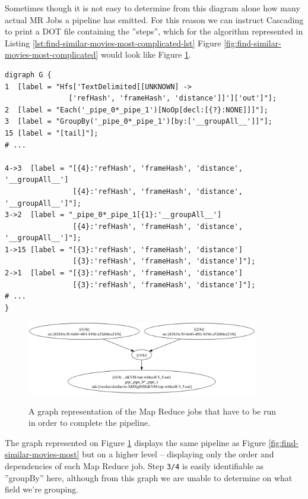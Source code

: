 Sometimes though it is not easy to determine from this diagram alone how many actual MR Jobs a pipeline has emitted. For this reason we can instruct Cascading to print a DOT file containing the ''steps'', which for the algorithm represented in Listing \ref{lst:find-similar-movies-most-complicated-lst} Figure \ref{fig:find-similar-movies-most-complicated} would look like Figure \ref{fig:find-similar-movies-most-complicated-steps}.

\begin{lstlisting}[caption={Fragments of FindMostSimilarMoviesJob.dot}, label={lst:find-similar-movies-most-complicated-lst}]
digraph G {
1  [label = "Hfs['TextDelimited[[UNKNOWN] -> 
               ['refHash', 'frameHash', 'distance']]']['out']"];
2  [label = "Each('_pipe_0*_pipe_1')[NoOp[decl:[{?}:NONE]]]"];
3  [label = "GroupBy('_pipe_0*_pipe_1')[by:['__groupAll__']]"];
15 [label = "[tail]"];
# ...
    
4->3  [label = "[{4}:'refHash', 'frameHash', 'distance', '__groupAll__']
                [{4}:'refHash', 'frameHash', 'distance', '__groupAll__']"];
3->2  [label = "_pipe_0*_pipe_1[{1}:'__groupAll__']
                [{4}:'refHash', 'frameHash', 'distance', '__groupAll__']"];
1->15 [label = "[{3}:'refHash', 'frameHash', 'distance']
                [{3}:'refHash', 'frameHash', 'distance']"];
2->1  [label = "[{3}:'refHash', 'frameHash', 'distance']
                [{3}:'refHash', 'frameHash', 'distance']"];
# ...
}
\end{lstlisting}


\begin{figure}[ch!]
  \centering
  \includegraphics[width=0.9\textwidth]{img/FindSimilarMoviesV2Job-steps_dot.png}
  \label{fig:find-similar-movies-most-complicated-steps}
  \caption{A graph representation of the Map Reduce jobs that have to be run in order to complete the pipeline.}
\end{figure}

The graph represented on Figure \ref{fig:find-similar-movies-most-complicated-steps} displays the same pipeline as Figure \ref{fig:find-similar-movies-most} but on a higher level -- displaying only the order and dependencies of each Map Reduce job. Step \verb|3/4| is easily identifiable as ''groupBy'' here, although from this graph we are unable to determine on what field we're grouping.








